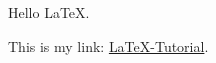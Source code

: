 \documentclass{article}
\begin{document}
  Hello LaTeX.

  This is my link: \href{http://www.latex-tutorial.com}{LaTeX-Tutorial}.
\end{document}
